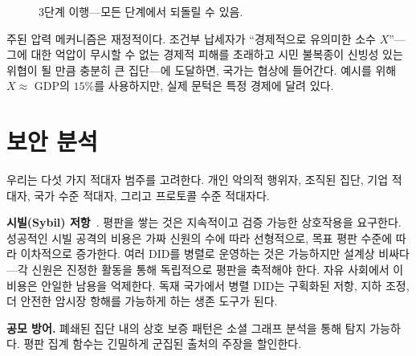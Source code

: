 \documentclass[11pt,a4paper,twocolumn]{article}
\begin{document}
\begin{figure}[ht]
\centering
{}
\caption{3단계 이행---모든 단계에서 되돌릴 수 있음.}
\label{fig:migration}
\end{figure}

주된 압력 메커니즘은 재정적이다. 조건부 납세자가 ``경제적으로 유의미한 소수 $X$''---그에 대한 억압이 무시할 수 없는 경제적 피해를 초래하고 시민 불복종이 신빙성 있는 위협이 될 만큼 충분히 큰 집단---에 도달하면, 국가는 협상에 들어간다. 예시를 위해 $X \approx$ GDP의 $15\%$를 사용하지만, 실제 문턱은 특정 경제에 달려 있다.

\section{보안 분석}

우리는 다섯 가지 적대자 범주를 고려한다. 개인 악의적 행위자, 조직된 집단, 기업 적대자, 국가 수준 적대자, 그리고 프로토콜 수준 적대자다.

\textbf{시빌(Sybil) 저항}~\cite{douceur2002}. 평판을 쌓는 것은 지속적이고 검증 가능한 상호작용을 요구한다. 성공적인 시빌 공격의 비용은 가짜 신원의 수에 따라 선형적으로, 목표 평판 수준에 따라 이차적으로 증가한다. 여러 DID를 병렬로 운영하는 것은 가능하지만 설계상 비싸다---각 신원은 진정한 활동을 통해 독립적으로 평판을 축적해야 한다. 자유 사회에서 이 비용은 안일한 남용을 억제한다. 독재 국가에서 병렬 DID는 구획화된 저항, 지하 조정, 더 안전한 암시장 항해를 가능하게 하는 생존 도구가 된다.

\textbf{공모 방어.} 폐쇄된 집단 내의 상호 보증 패턴은 소셜 그래프 분석을 통해 탐지 가능하다. 평판 집계 함수는 긴밀하게 군집된 출처의 주장을 할인한다.
\end{document}
